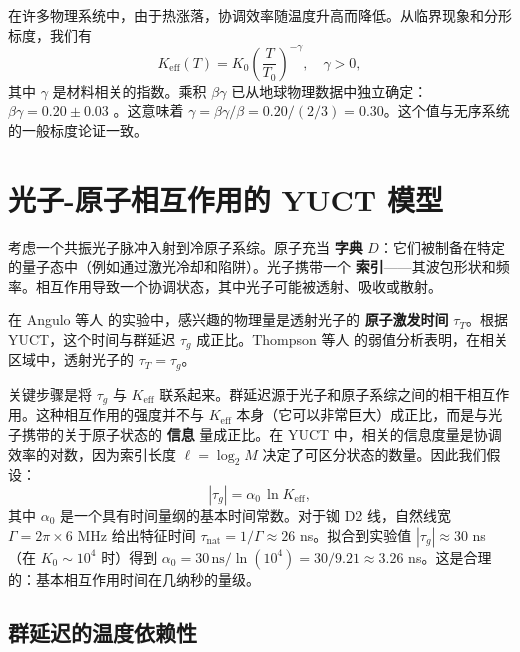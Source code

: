 \documentclass[12pt,a4paper]{article}
\newcommand{\Keff}{K_{\mathrm{eff}}}
\newcommand{\betagamma}{\beta\gamma}
\newcommand{\betac}{\beta}
\begin{document}
	在许多物理系统中，由于热涨落，协调效率随温度升高而降低。从临界现象和分形标度，我们有
	\begin{equation}
		\Keff(T) = K_0 \left(\frac{T}{T_0}\right)^{-\gamma}, \quad \gamma > 0,
		\label{eq:K_T}
	\end{equation}
	其中 \(\gamma\) 是材料相关的指数。乘积 \(\betac\gamma\) 已从地球物理数据中独立确定：\(\betagamma = 0.20 \pm 0.03\) \cite{Yakushev2026b}。这意味着 \(\gamma = \betagamma / \betac = 0.20 / (2/3) = 0.30\)。这个值与无序系统的一般标度论证一致。
	
	\section{光子-原子相互作用的 YUCT 模型}
	
	考虑一个共振光子脉冲入射到冷原子系综。原子充当 \textbf{字典} \(D\)：它们被制备在特定的量子态中（例如通过激光冷却和陷阱）。光子携带一个 \textbf{索引}——其波包形状和频率。相互作用导致一个协调状态，其中光子可能被透射、吸收或散射。
	
	在 Angulo 等人 \cite{Angulo2024} 的实验中，感兴趣的物理量是透射光子的 \textbf{原子激发时间} \(\tau_T\)。根据 YUCT，这个时间与群延迟 \(\tau_g\) 成正比。Thompson 等人 \cite{Thompson2023} 的弱值分析表明，在相关区域中，透射光子的 \(\tau_T = \tau_g\)。
	
	关键步骤是将 \(\tau_g\) 与 \(\Keff\) 联系起来。群延迟源于光子和原子系综之间的相干相互作用。这种相互作用的强度并不与 \(\Keff\) 本身（它可以非常巨大）成正比，而是与光子携带的关于原子状态的 \textbf{信息} 量成正比。在 YUCT 中，相关的信息度量是协调效率的对数，因为索引长度 \(\ell = \log_2 M\) 决定了可区分状态的数量。因此我们假设：
	\begin{equation}
		|\tau_g| = \alpha_0 \, \ln\Keff,
		\label{eq:tau_log}
	\end{equation}
	其中 \(\alpha_0\) 是一个具有时间量纲的基本时间常数。对于铷 D2 线，自然线宽 \(\Gamma = 2\pi \times 6\) MHz 给出特征时间 \(\tau_{\text{nat}} = 1/\Gamma \approx 26\) ns。拟合到实验值 \(|\tau_g| \approx 30\) ns（在 \(K_0 \sim 10^4\) 时）得到 \(\alpha_0 = 30\,\text{ns} / \ln(10^4) = 30 / 9.21 \approx 3.26\) ns。这是合理的：基本相互作用时间在几纳秒的量级。
	
	\subsection{群延迟的温度依赖性}
	
\end{document}
